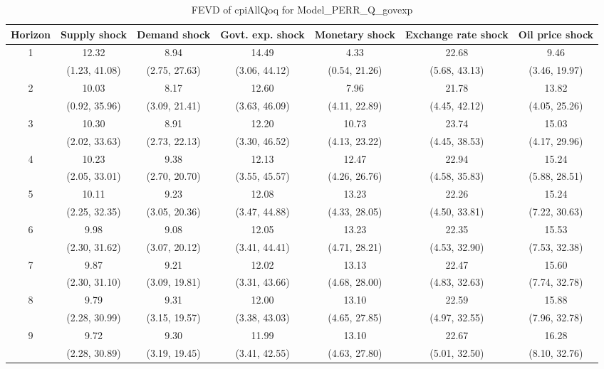 \documentclass{article}
\begin{document}
\begin{table}
	\footnotesize
	\caption{FEVD of cpiAllQoq for Model_PERR_Q_govexp}
	\begin{tabular}{ccccccc}
		Horizon & Supply shock & Demand shock & Govt. exp. shock & Monetary shock & Exchange rate shock & Oil price shock\\ \hline
		\multirow{2}{*}{1} & 12.32 & 8.94 & 14.49 & 4.33 & 22.68 & 9.46\\
		 & (1.23, 41.08) & (2.75, 27.63) & (3.06, 44.12) & (0.54, 21.26) & (5.68, 43.13) & (3.46, 19.97)\\
		\multirow{2}{*}{2} & 10.03 & 8.17 & 12.60 & 7.96 & 21.78 & 13.82\\
		 & (0.92, 35.96) & (3.09, 21.41) & (3.63, 46.09) & (4.11, 22.89) & (4.45, 42.12) & (4.05, 25.26)\\
		\multirow{2}{*}{3} & 10.30 & 8.91 & 12.20 & 10.73 & 23.74 & 15.03\\
		 & (2.02, 33.63) & (2.73, 22.13) & (3.30, 46.52) & (4.13, 23.22) & (4.45, 38.53) & (4.17, 29.96)\\
		\multirow{2}{*}{4} & 10.23 & 9.38 & 12.13 & 12.47 & 22.94 & 15.24\\
		 & (2.05, 33.01) & (2.70, 20.70) & (3.55, 45.57) & (4.26, 26.76) & (4.58, 35.83) & (5.88, 28.51)\\
		\multirow{2}{*}{5} & 10.11 & 9.23 & 12.08 & 13.23 & 22.26 & 15.24\\
		 & (2.25, 32.35) & (3.05, 20.36) & (3.47, 44.88) & (4.33, 28.05) & (4.50, 33.81) & (7.22, 30.63)\\
		\multirow{2}{*}{6} & 9.98 & 9.08 & 12.05 & 13.23 & 22.35 & 15.53\\
		 & (2.30, 31.62) & (3.07, 20.12) & (3.41, 44.41) & (4.71, 28.21) & (4.53, 32.90) & (7.53, 32.38)\\
		\multirow{2}{*}{7} & 9.87 & 9.21 & 12.02 & 13.13 & 22.47 & 15.60\\
		 & (2.30, 31.10) & (3.09, 19.81) & (3.31, 43.66) & (4.68, 28.00) & (4.83, 32.63) & (7.74, 32.78)\\
		\multirow{2}{*}{8} & 9.79 & 9.31 & 12.00 & 13.10 & 22.59 & 15.88\\
		 & (2.28, 30.99) & (3.15, 19.57) & (3.38, 43.03) & (4.65, 27.85) & (4.97, 32.55) & (7.96, 32.78)\\
		\multirow{2}{*}{9} & 9.72 & 9.30 & 11.99 & 13.10 & 22.67 & 16.28\\
		 & (2.28, 30.89) & (3.19, 19.45) & (3.41, 42.55) & (4.63, 27.80) & (5.01, 32.50) & (8.10, 32.76)\\

\end{tabular}
\end{table}
\end{document}
